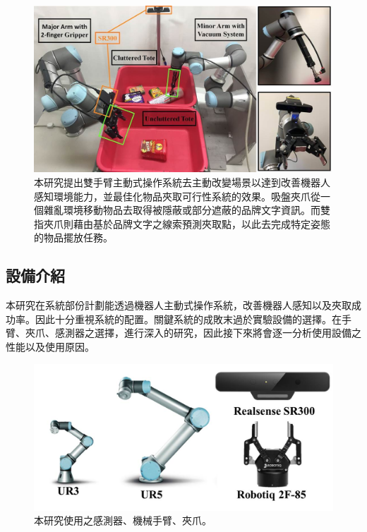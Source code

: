 \begin{figure}[H]
	\centering
	\includegraphics[height=!, width=1.0\linewidth, keepaspectratio=true]
	{./figures/hardware_archi_v2.jpg}
  \caption{本研究提出雙手臂主動式操作系統去主動改變場景以達到改善機器人感知環境能力，並最佳化物品夾取可行性系統的效果。吸盤夾爪從一個雜亂環境移動物品去取得被隱蔽或部分遮蔽的品牌文字資訊。而雙指夾爪則藉由基於品牌文字之線索預測夾取點，以此去完成特定姿態的物品擺放任務。}
  \label{figure:robot_system_v2}
\end{figure}


\subsection{設備介紹}
本研究在系統部份計劃能透過機器人主動式操作系統，改善機器人感知以及夾取成功率。因此十分重視系統的配置。關鍵系統的成敗末過於實驗設備的選擇。在手臂、夾爪、感測器之選擇，進行深入的研究，因此接下來將會逐一分析使用設備之性能以及使用原因。

\begin{figure}[H]
  \centering
  \includegraphics[height=!, width=1.0\linewidth, keepaspectratio=true]
  {./figures/hardware_list.jpg}
  \caption{本研究使用之感測器、機械手臂、夾爪。}
  \label{figure:hardware_list}
\end{figure}


